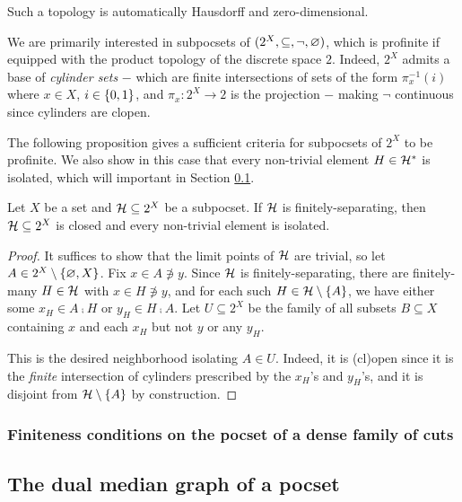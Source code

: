 \documentclass{amsart}
\begin{document}
    \begin{remark}
        Such a topology is automatically Hausdorff and zero-dimensional.
    \end{remark}

    We are primarily interested in subpocsets of $(2^X,\subseteq,\lnot,\em)$, which is profinite if equipped with the product topology of the discrete space $2$. Indeed, $2^X$ admits a base of \textit{cylinder sets} $-$ which are finite intersections of sets of the form $\pi^{-1}_x(i)$ where $x\in X$, $i\in\l\{0,1\r\}$, and $\pi_x:2^X\to2$ is the projection $-$ making $\lnot$ continuous since cylinders are clopen. {\color{red}{Show that it is totally order-disconnected.}}

    The following proposition gives a sufficient criteria for subpocsets of $2^X$ to be profinite. We also show in this case that every non-trivial element $H\in\mc{H}^\ast$ is isolated, which will important in Section \ref{sec:the_dual_median_graph_of_a_pocset}.

    \begin{proposition}\label{prp:finitely-separating_non-trivial_isolated}
        Let $X$ be a set and $\mc{H}\subseteq2^X$ be a subpocset. If $\mc{H}$ is finitely-separating, then $\mc{H}\subseteq2^X$ is closed and every non-trivial element is isolated.
    \end{proposition}
    \begin{proof}
        It suffices to show that the limit points of $\mc{H}$ are trivial, so let $A\in2^X\comp\l\{\em,X\r\}$. Fix $x\in A\not\ni y$. Since $\mc{H}$ is finitely-separating, there are finitely-many $H\in\mc{H}$ with $x\in H\not\ni y$, and for each such $H\in\mc{H}\comp\l\{A\r\}$, we have either some $x_H\in A\comp H$ or $y_H\in H\comp A$. Let $U\subseteq2^X$ be the family of all subsets $B\subseteq X$ containing $x$ and each $x_H$ but not $y$ or any $y_H$.

        This is the desired neighborhood isolating $A\in U$. Indeed, it is (cl)open since it is the \textit{finite} intersection of cylinders prescribed by the $x_H$'s and $y_H$'s, and it is disjoint from $\mc{H}\comp\l\{A\r\}$ by construction.
    \end{proof}

    \subsubsection{Finiteness conditions on the pocset of a dense family of cuts}

    \subsection{The dual median graph of a pocset}\label{sec:the_dual_median_graph_of_a_pocset}
\end{document}
